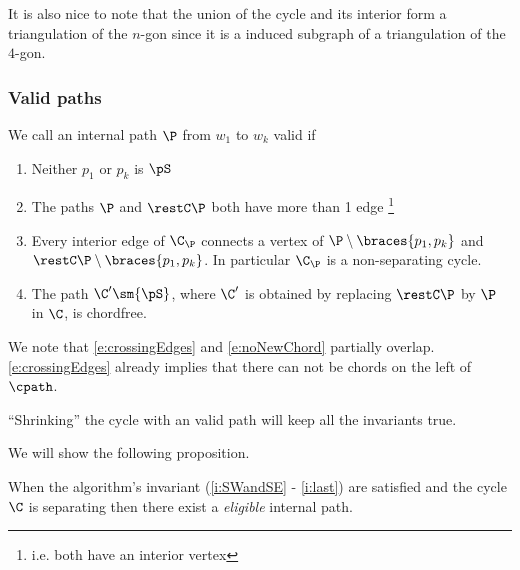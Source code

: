 It is also nice to note that the union of the cycle and its interior form a triangulation of the $n$-gon since it is a induced subgraph of a triangulation of the $4$-gon.


\subsubsection{Valid paths}

\begin{defi}
We call an internal path $\P$ from $w_1$ to $w_k$ valid if
\begin{enumerate}
 \renewcommand*{\labelenumi}{(E\arabic{enumi})}%
 \renewcommand*{\theenumi}{(E\arabic{enumi})}%


\item Neither $p_1$ or $p_k$ is $\pS$
\label{e:noS}

\item The paths $\P$ and $\restC \P$ both have more than 1 edge \footnote{i.e. both have an interior vertex}
\label{e:longBorders}

\item Every interior edge of $\C_\P$ connects a vertex of $\P\setminus{\braces{p_1,p_k}}$ and $\restC \P \setminus{\braces{p_1,p_k}}$. In particular $\C_\P$ is a non-separating cycle.
\label{e:crossingEdges}

\item The path $\C'\sm{\pS}$, where $\C'$ is obtained by replacing $\restC \P$ by $\P$ in $\C$, is chordfree.
\label{e:noNewChord}

\end{enumerate}
\end{defi}

We note that \ref{e:crossingEdges} and \ref{e:noNewChord} partially overlap. \ref{e:crossingEdges} already implies that there can not be chords on the left of $\cpath$.


\begin{remark}
``Shrinking'' the cycle with an valid path will keep all the invariants true.
\end{remark}

We will show the following proposition.



\begin{thrm}
\label{th:eligExistence}
When the algorithm's invariant (\ref{i:SWandSE} - \ref{i:last}) are satisfied and the cycle $\C$ is separating then there exist a \emph{eligible} internal path.
\end{thrm}

